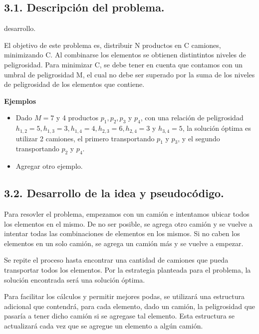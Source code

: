 \subsection{3.1. Descripción del problema.}

\vspace*{0.3cm}

desarrollo.

\vspace*{0.75cm} \noindent

El objetivo de este problema es, distribuir N productos en C camiones, minimizando
C. Al combinarse los elementos se obtienen distintintos niveles de peligrosidad.
Para minimizar C, se debe tener en cuenta que contamos con un umbral de peligrosidad
M, el cual no debe ser superado por la suma de los niveles de peligrosidad de los
elementos que contiene.

\textbf{Ejemplos}
\begin{itemize}
  \item Dado $M = 7$ y 4 productos $p_1, p_2, p_3$ y $p_4$, con una relación
  de peligrosidad $h_{1,2} = 5, h_{1,3} = 3, h_{1,4} = 4, h_{2,3} = 6, h_{2,4} =
  3$ y $h_{3,4} = 5$, la solución óptima es utilizar 2 camiones, el primero
  transportando $p_1$ y $p_3$, y el segundo transportando $p_2$ y $p_4$.
  \item Agregar otro ejemplo.
\end{itemize}





\subsection{3.2. Desarrollo de la idea y pseudocódigo.}

Para resovler el problema, empezamos con un camión e intentamos ubicar todos los
elementos en el mismo. De no ser posible, se agrega otro camión y se vuelve a
intentar todas las combinaciones de elementos en los mismos. Si no caben los
elementos en un solo camión, se agrega un camión más y se vuelve a empezar.

Se repite el proceso hasta encontrar una cantidad de camiones que pueda transportar
todos los elementos. Por la estrategia planteada para el problema, la solución
encontrada será una solución óptima.

Para facilitar los cálculos y permitir mejores podas, se utilizará una estructura
adicional que contendrá, para cada elemento, dado un camión, la peligrosidad que
pasaría a tener dicho camión si se agregase tal elemento. Esta estructura se
actualizará cada vez que se agregue un elemento a algún camión. 

